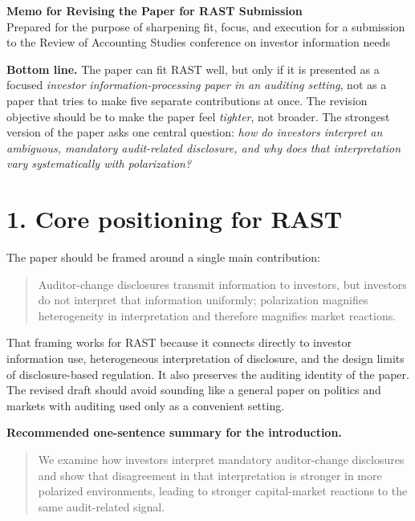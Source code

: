 \documentclass[11pt]{article}
\begin{document}
\begin{center}
    {\Large \textbf{Memo for Revising the Paper for RAST Submission}}\\[0.5em]
    {\normalsize Prepared for the purpose of sharpening fit, focus, and execution for a submission to the Review of Accounting Studies conference on investor information needs}
\end{center}

\vspace{0.75em}

\textbf{Bottom line.} The paper can fit RAST well, but only if it is presented as a focused \emph{investor information-processing paper in an auditing setting}, not as a paper that tries to make five separate contributions at once. The revision objective should be to make the paper feel \emph{tighter}, not broader. The strongest version of the paper asks one central question: \emph{how do investors interpret an ambiguous, mandatory audit-related disclosure, and why does that interpretation vary systematically with polarization?}

\section*{1. Core positioning for RAST}

The paper should be framed around a single main contribution:
\begin{quote}
Auditor-change disclosures transmit information to investors, but investors do not interpret that information uniformly; polarization magnifies heterogeneity in interpretation and therefore magnifies market reactions.
\end{quote}

That framing works for RAST because it connects directly to investor information use, heterogeneous interpretation of disclosure, and the design limits of disclosure-based regulation. It also preserves the auditing identity of the paper. The revised draft should avoid sounding like a general paper on politics and markets with auditing used only as a convenient setting.

\textbf{Recommended one-sentence summary for the introduction.}

\begin{quote}
We examine how investors interpret mandatory auditor-change disclosures and show that disagreement in that interpretation is stronger in more polarized environments, leading to stronger capital-market reactions to the same audit-related signal.
\end{quote}
\end{document}
